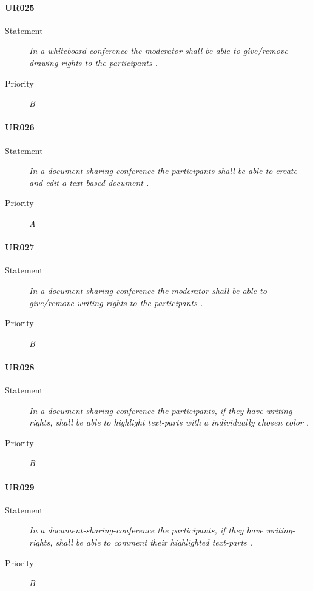 \paragraph{UR025}
  \begin{description}
  \item [Statement] 
    \textit{ In a whiteboard-conference the moderator shall be able to give/remove drawing rights to the participants
    .}
  \item [Priority] \textit{B}
\end{description}
    
\paragraph{UR026}
  \begin{description}
  \item [Statement] 
    \textit{ In a document-sharing-conference the participants shall be able to create and edit a text-based document
    .}
  \item [Priority] \textit{A}
\end{description}

\paragraph{UR027}
  \begin{description}
  \item [Statement] 
    \textit{ In a document-sharing-conference the moderator shall be able to give/remove writing rights to the participants
    .}
  \item [Priority] \textit{B}
\end{description}
    
\paragraph{UR028}
  \begin{description}
  \item [Statement] 
    \textit{ In a document-sharing-conference the participants, if they have writing-rights, 
            shall be able to highlight text-parts with a individually chosen color
    .}
  \item [Priority] \textit{B}
\end{description}
    
\paragraph{UR029}
  \begin{description}
  \item [Statement] 
    \textit{ In a document-sharing-conference the participants, if they have writing-rights, 
            shall be able to comment their highlighted text-parts
    .}
  \item [Priority] \textit{B}
\end{description}
    
